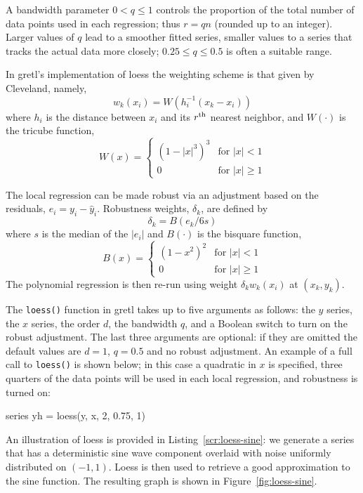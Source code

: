 A bandwidth parameter $0 < q \leq 1$ controls the proportion of the
total number of data points used in each regression; thus $r = qn$
(rounded up to an integer). Larger values of $q$ lead to a smoother
fitted series, smaller values to a series that tracks the actual data
more closely; $0.25 \leq q \leq 0.5$ is often a suitable range.

In gretl's implementation of loess the weighting scheme is
that given by Cleveland, namely,
\[
w_k(x_i) = W(h_i^{-1}(x_k - x_i))
\]
where $h_i$ is the distance between $x_i$ and its $r^{\rm th}$ nearest
neighbor, and $W(\cdot)$ is the tricube function,
\[
W(x) = \begin{cases}
 (1 - |x|^3)^3 & \mbox{for } |x| < 1 \\
  0            & \mbox{for } |x| \geq 1
\end{cases}
\]

The local regression can be made robust via an adjustment based on the
residuals, $e_i = y_i - \hat{y}_i$. Robustness weights, $\delta_k$, are
defined by
\[
\delta_k = B(e_k / 6s)
\]
where $s$ is the median of the $|e_i|$ and $B(\cdot)$ is the
bisquare function,
\[
B(x) = \begin{cases}
 (1 - x^2)^2 & \mbox{for } |x| < 1 \\
  0          & \mbox{for } |x| \geq 1
\end{cases}
\]
The polynomial regression is then re-run using weight
$\delta_kw_k(x_i)$ at $(x_k, y_k)$.

The \texttt{loess()} function in gretl takes up to five
arguments as follows: the $y$ series, the $x$ series, the order $d$,
the bandwidth $q$, and a Boolean switch to turn on the robust
adjustment. The last three arguments are optional: if they are omitted
the default values are $d=1$, $q=0.5$ and no robust adjustment. An
example of a full call to \texttt{loess()} is shown below; in this
case a quadratic in $x$ is specified, three quarters of the data
points will be used in each local regression, and robustness is turned
on:
\begin{code}
series yh = loess(y, x, 2, 0.75, 1)
\end{code}

An illustration of loess is provided in Listing~\ref{scr:loess-sine}:
we generate a series that has a deterministic sine wave component
overlaid with noise uniformly distributed on $(-1,1)$. Loess is then
used to retrieve a good approximation to the sine function.  The
resulting graph is shown in Figure~\ref{fig:loess-sine}.

